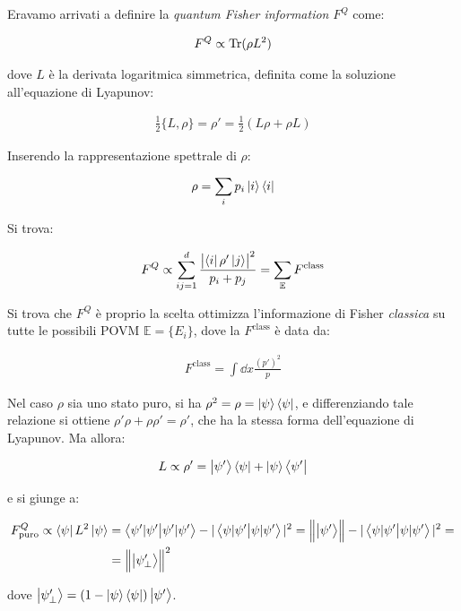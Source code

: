 \documentclass[main.tex]{subfiles}
\begin{document}
Eravamo arrivati a definire la \textit{quantum Fisher information} \(F^Q\) come:

\begin{align*}
F^Q \propto \operatorname*{Tr} (\rho L^2)
\end{align*}

dove \(L\) è la derivata logaritmica simmetrica, definita come la soluzione all'equazione di Lyapunov:

\begin{align*}
\frac{1}{2}\{ L,\rho\} = \rho' = \frac{1}{2}(L\rho + \rho L)
\end{align*}

Inserendo la rappresentazione spettrale di $\rho$:

\begin{align*}
\rho = \sum_i p_i \ket{i}\bra{i}
\end{align*}

Si trova:

\begin{align*}
F^Q \propto \sum_{ij=1}^d \frac{\abs{\bra{i}\rho'\ket{j}}^2}{p_i + p_j} = \sum_{\mathbb{E}} F^{\text{class}}
\end{align*}

Si trova che $F^Q$ è proprio la scelta ottimizza l'informazione di Fisher \textit{classica} su tutte le possibili POVM $\mathbb{E}=\{E_i\}$, dove la $F^{\mathrm{class}}$ è data da:

\begin{align*}
F^{\text{class}} = \int \dd{x} \frac{(p')^2}{p}
\end{align*}

Nel caso $\rho$ sia uno stato puro, si ha $\rho^2 = \rho = \ket{\psi}\bra{\psi}$, e differenziando tale relazione si ottiene $\rho'\rho + \rho \rho' = \rho'$, che ha la stessa forma dell'equazione di Lyapunov. Ma allora:

\begin{align*}
L \propto \rho' = \ket{\psi'}\bra{\psi} + \ket{\psi}\bra{\psi'}
\end{align*}

e si giunge a:

\begin{align*}
F^{Q}_{\mathrm{puro}} \propto \bra{\psi}L^2 \ket{\psi} &= \braket{\psi'|\psi'} - |\braket{\psi|\psi'}|^2 = \norm{\ket{\psi'}}
-|\braket{\psi|\psi'}|^2 =\\
&= \norm{\ket{\psi_\perp'}}^2
\end{align*}

dove $\ket{\psi_\perp'}=(1-\ket{\psi}\bra{\psi})\ket{\psi'}$.\\
\end{document}
